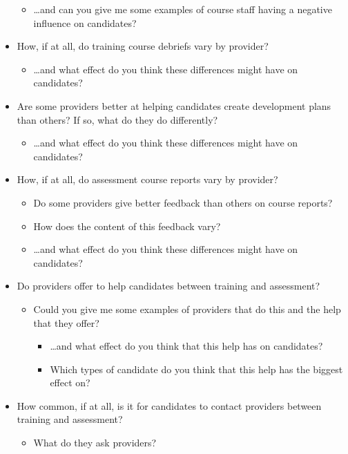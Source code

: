 \documentclass[
  12pt,
  a4paper,
]{book}
\providecommand{\tightlist}{%
  \setlength{\itemsep}{0pt}\setlength{\parskip}{0pt}}
\begin{document}
\begin{itemize}
  \begin{itemize}
  \tightlist
  \item
    \ldots and can you give me some examples of course staff having a negative influence on candidates?
  \end{itemize}
\item
  How, if at all, do training course debriefs vary by provider?

  \begin{itemize}
  \tightlist
  \item
    \ldots and what effect do you think these differences might have on candidates?
  \end{itemize}
\item
  Are some providers better at helping candidates create development plans than others? If so, what do they do differently?

  \begin{itemize}
  \tightlist
  \item
    \ldots and what effect do you think these differences might have on candidates?
  \end{itemize}
\item
  How, if at all, do assessment course reports vary by provider?

  \begin{itemize}
  \tightlist
  \item
    Do some providers give better feedback than others on course reports?
  \item
    How does the content of this feedback vary?
  \item
    \ldots and what effect do you think these differences might have on candidates?
  \end{itemize}
\item
  Do providers offer to help candidates between training and assessment?

  \begin{itemize}
  \tightlist
  \item
    Could you give me some examples of providers that do this and the help that they offer?

    \begin{itemize}
    \tightlist
    \item
      \ldots and what effect do you think that this help has on candidates?
    \item
      Which types of candidate do you think that this help has the biggest effect on?
    \end{itemize}
  \end{itemize}
\item
  How common, if at all, is it for candidates to contact providers between training and assessment?

  \begin{itemize}
  \tightlist
  \item
    What do they ask providers?
  \end{itemize}
\end{itemize}
\end{document}
